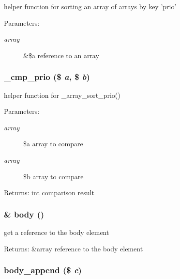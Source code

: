 helper function for sorting an array of arrays by key 'prio'

\begin{Desc}
\item[Parameters:]
\begin{description}
\item[{\em array}]\&\$a reference to an array \end{description}
\end{Desc}
\hypertarget{html_8inc_8php_f8ecadff0a4b78867d4da5eae49615e1}{
\subsubsection[{\_\-cmp\_\-prio}]{\setlength{\rightskip}{0pt plus 5cm}\_\-cmp\_\-prio (\$ {\em a}, \/  \$ {\em b})}}
\label{html_8inc_8php_f8ecadff0a4b78867d4da5eae49615e1}


helper function for \_\-array\_\-sort\_\-prio()

\begin{Desc}
\item[Parameters:]
\begin{description}
\item[{\em array}]\$a array to compare \item[{\em array}]\$b array to compare \end{description}
\end{Desc}
\begin{Desc}
\item[Returns:]int comparison result \end{Desc}
\hypertarget{html_8inc_8php_8b842636055e9a5853a7a10a9e002330}{
\subsubsection[{body}]{\setlength{\rightskip}{0pt plus 5cm}\& body ()}}
\label{html_8inc_8php_8b842636055e9a5853a7a10a9e002330}


get a reference to the body element

\begin{Desc}
\item[Returns:]\&array reference to the body element \end{Desc}
\hypertarget{html_8inc_8php_d27881abf3a2004d287434d8c8d7cdf6}{
\subsubsection[{body\_\-append}]{\setlength{\rightskip}{0pt plus 5cm}body\_\-append (\$ {\em c})}}
\label{html_8inc_8php_d27881abf3a2004d287434d8c8d7cdf6}


